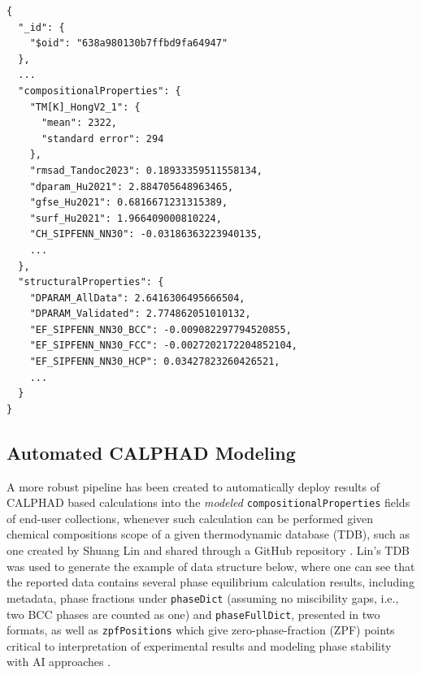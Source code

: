 \begin{verbatim}
{
  "_id": {
    "$oid": "638a980130b7ffbd9fa64947"
  },
  ...
  "compositionalProperties": {
    "TM[K]_HongV2_1": {
      "mean": 2322,
      "standard error": 294
    },
    "rmsad_Tandoc2023": 0.18933359511558134,
    "dparam_Hu2021": 2.884705648963465,
    "gfse_Hu2021": 0.6816671231315389,
    "surf_Hu2021": 1.966409000810224,
    "CH_SIPFENN_NN30": -0.03186363223940135,
    ...
  },
  "structuralProperties": {
    "DPARAM_AllData": 2.6416306495666504,
    "DPARAM_Validated": 2.774862051010132,
    "EF_SIPFENN_NN30_BCC": -0.009082297794520855,
    "EF_SIPFENN_NN30_FCC": -0.0027202172204852104,
    "EF_SIPFENN_NN30_HCP": 0.03427823260426521,
    ...
  }
}
\end{verbatim}


\subsection{Automated CALPHAD Modeling} \label{ultera:ssec:autocalphad}

A more robust pipeline has been created to automatically deploy results of CALPHAD \cite{Olson2023GenomicDynamics} based calculations into the \emph{modeled} \texttt{compositionalProperties} fields of end-user collections, whenever such calculation can be performed given chemical compositions scope of a given thermodynamic database (TDB), such as one created by Shuang Lin and shared through a GitHub repository \cite{LinShuangLin212/refractory-elements-database:ZR}. Lin's TDB was used to generate the example of data structure below, where one can see that the reported data contains several phase equilibrium calculation results, including metadata, phase fractions under \texttt{phaseDict} (assuming no miscibility gaps, i.e., two BCC phases are counted as one) and \texttt{phaseFullDict}, presented in two formats, as well as \texttt{zpfPositions} which give zero-phase-fraction (ZPF) points critical to interpretation of experimental results \cite{Li2024DesignExperiments} and modeling phase stability with AI approaches \cite{Wu2023EstimatingApproach}.

